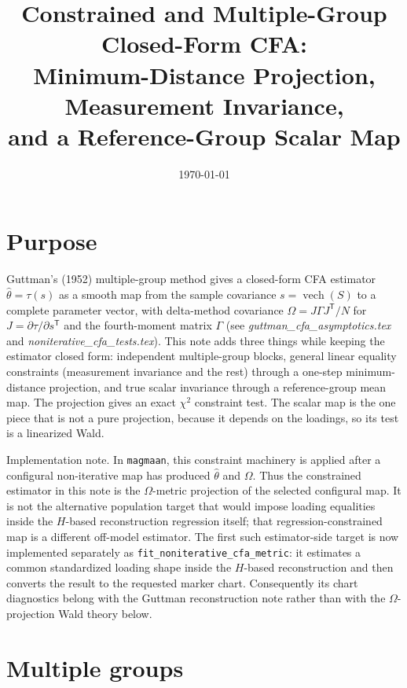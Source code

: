\documentclass[11pt]{article}
\title{Constrained and Multiple-Group Closed-Form CFA:\\
       Minimum-Distance Projection, Measurement Invariance,\\
       and a Reference-Group Scalar Map}
\author{}
\date{\today}
\newcommand{\T}{^{\mathsf T}}
\newcommand{\vech}{\operatorname{vech}}
\newcommand{\Om}{\Omega}
\theoremstyle{plain}
\theoremstyle{remark}
\begin{document}
\maketitle

\section*{Purpose}

Guttman's (1952) multiple-group method gives a closed-form CFA estimator
$\hat\theta = \tau(s)$ as a smooth map from the sample covariance
$s = \vech(S)$ to a complete parameter vector, with delta-method covariance
$\Om = J\Gamma J\T / N$ for $J = \partial\tau/\partial s\T$ and the fourth-moment
matrix $\Gamma$ (see \emph{guttman\_cfa\_asymptotics.tex} and
\emph{noniterative\_cfa\_tests.tex}). This note adds three things while keeping
the estimator closed form: independent multiple-group blocks, general linear
equality constraints (measurement invariance and the rest) through a one-step
minimum-distance projection, and true scalar invariance through a
reference-group mean map. The projection gives an exact $\chi^2$ constraint
test. The scalar map is the one piece that is not a pure projection, because it
depends on the loadings, so its test is a linearized Wald.

Implementation note. In \texttt{magmaan}, this constraint machinery is applied
after a configural non-iterative map has produced \(\hat\theta\) and
\(\Om\). Thus the constrained estimator in this note is the
\(\Om\)-metric projection of the selected configural map. It is not the
alternative population target that would impose loading equalities inside the
\(H\)-based reconstruction regression itself; that regression-constrained map is
a different off-model estimator. The first such estimator-side target is now
implemented separately as \texttt{fit\_noniterative\_cfa\_metric}: it estimates a
common standardized loading shape inside the \(H\)-based reconstruction and then
converts the result to the requested marker chart. Consequently its chart
diagnostics belong with the Guttman reconstruction note rather than with the
\(\Om\)-projection Wald theory below.

\section{Multiple groups}
\end{document}
